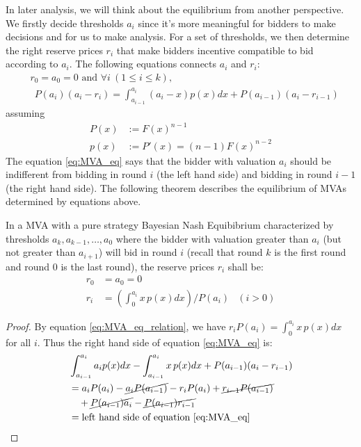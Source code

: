 In later analysis, we will think about the equilibrium from another
perspective.  We firstly decide thresholds $a_i$ since it's more meaningful for
bidders to make decisions and for us to make analysis. For a set of thresholds,
we then determine the right reserve prices $r_i$ that make bidders incentive
compatible to bid according to $a_i$. The following equations connects $a_i$
and $r_i$:
\begin{align}\label{eq:MVA_eq}
    &r_0 = a_0 = 0 \mbox{ and }
    \forall i ~(1 \leq i \leq k),\nonumber\\
    &~~P(a_{i})(a_{i}-r_i) =
    \int_{a_{i-1}}^{a_{i}}(a_{i}-x)p(x)dx+P(a_{i-1})(a_{i}-r_{i-1})
\end{align}
assuming
\begin{align*}
    P(x) &:= F(x)^{n-1}\\
    p(x) &:= P'(x) = (n-1)F(x)^{n-2}
\end{align*}
The equation \ref{eq:MVA_eq} says that the bidder with valuation $a_i$ should be
indifferent from bidding in round $i$ (the left hand side) and bidding in round
$i-1$(the right hand side).  The following theorem describes the equilibrium of
MVAs determined by equations above.

\begin{theorem}
In a MVA with a pure strategy Bayesian Nash Equibibrium characterized by
thresholds $a_k, a_{k-1}, \ldots, a_0$ where the bidder with valuation greater
than $a_i$ (but not greater than $a_{i+1}$) will bid in round $i$ (recall that
round $k$ is the first round and round $0$ is the last round), the reserve
prices $r_i$ shall be:
\begin{align}\label{eq:MVA_eq_relation}
  r_0 &= a_0 = 0 \nonumber \\
  r_i &= \left( \int_{0}^{a_i} x \, p(x) dx \right) / P(a_i) & (i > 0)
\end{align}
\end{theorem}

\begin{proof}
By equation \ref{eq:MVA_eq_relation}, we have $r_i P(a_i) = \int_{0}^{a_i}
x\,p(x)dx$ for all $i$. Thus the right
hand side of equation \ref{eq:MVA_eq} is:
\begin{align*}
	& \int_{a_{i-1}}^{a_i} a_i p(x) dx - \int_{a_{i-1}}^{a_i} x \, p(x) dx + P(a_{i-1})(a_i-r_{i-1}) \\
	&= a_i P(a_i) - \cancel{a_i P(a_{i-1})} - r_i P(a_i) + \cancel{r_{i-1} P(a_{i-1})} \\
		& ~~~ + \cancel{P(a_{i-1}) a_i} - \cancel{P(a_{i-1}) r_{i-1}}\\
	&= \mbox{left hand side of equation \ref{eq:MVA_eq}}
\end{align*}
\end{proof}

